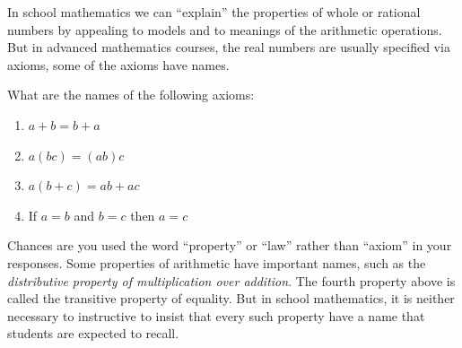 
\begin{question}
In school mathematics we can ``explain'' the properties of whole or rational numbers by appealing to models and to meanings of the arithmetic operations.  But in advanced mathematics courses, the real numbers are usually specified via axioms, some of the axioms have names.  

What are the names of the following axioms:  
\begin{enumerate}
\item $a + b = b + a$  
\item $a(bc) = (ab)c$
\item $a(b+c) = ab + ac$
\item If $a = b$ and $b = c$ then $a = c$ 
\end{enumerate}
\end{question}
\QM

Chances are you used the word ``property'' or ``law'' rather than ``axiom'' in your responses.  Some properties of arithmetic have important names, such as the \emph{distributive property of multiplication over addition}.  The fourth property above is called the transitive property of equality.  But in school mathematics, it is neither necessary to instructive to insist that every such property have a name that students are expected to recall.  


%


